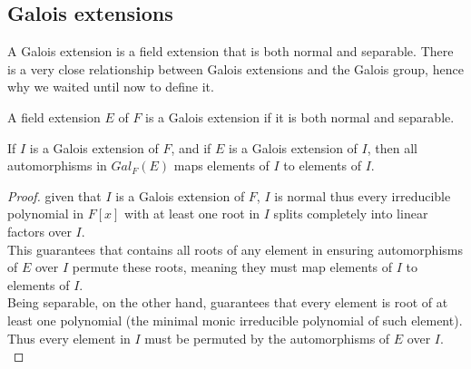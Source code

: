 \subsection{Galois extensions}
A Galois extension is a field extension that is both normal and separable. There 
is a very close relationship between Galois extensions and the Galois group,
hence why we waited until now to define it. 

\begin{definition}
    A field extension $E$ of $F$ is a Galois extension if it is both normal and separable.
\end{definition} \vspace{0.2em}

\begin{lemma}
\label{lem:galoisExtensionsGetsPermuted}
    If $I$ is a Galois extension of $F$, and if $E$ is a Galois extension of $I$, 
    then all automorphisms in $Gal_{F}(E)$ maps elements of $I$ to elements of $I$.
\end{lemma}
\begin{proof}
    given that $I$ is a Galois extension of $F$, $I$ is normal thus every irreducible polynomial 
    in $F[x]$ with at least one root in $I$ splits completely into linear factors over $I$. \\

    This guarantees that contains all roots of any element in ensuring automorphisms of $E$ over 
    $I$ permute these roots, meaning they must map elements of $I$ to elements of $I$. \\

    Being separable, on the other hand, guarantees that every element is root of at least 
    one polynomial (the minimal monic irreducible polynomial of such element). Thus every 
    element in $I$ must be permuted by the automorphisms of $E$ over $I$. \\
\end{proof} \vspace{0.2em}

